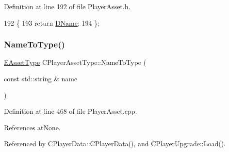 Definition at line 192 of file Player\+Asset.\+h.


\begin{DoxyCode}
192                               \{
193             \textcolor{keywordflow}{return} \hyperlink{classCPlayerAssetType_a95b557ce33af1aaecb26e8d78b0e2706}{DName};  
194         \};
\end{DoxyCode}
\hypertarget{classCPlayerAssetType_a42d55b6d7606e021c063fce3a14c56de}{}\label{classCPlayerAssetType_a42d55b6d7606e021c063fce3a14c56de} 
\subsubsection{\texorpdfstring{Name\+To\+Type()}{NameToType()}}
{\footnotesize\ttfamily \hyperlink{GameDataTypes_8h_a5600d4fc433b83300308921974477fec}{E\+Asset\+Type} C\+Player\+Asset\+Type\+::\+Name\+To\+Type (\begin{DoxyParamCaption}\item[{const std\+::string \&}]{name }\end{DoxyParamCaption})\hspace{0.3cm}{\ttfamily [static]}}



Definition at line 468 of file Player\+Asset.\+cpp.



References at\+None.



Referenced by C\+Player\+Data\+::\+C\+Player\+Data(), and C\+Player\+Upgrade\+::\+Load().


